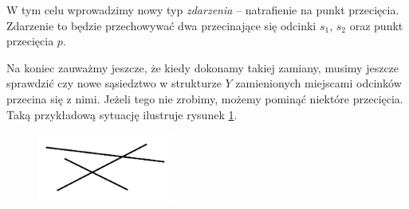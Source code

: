 W tym celu wprowadzimy nowy typ \textit{zdarzenia} -- natrafienie na punkt 
przecięcia. Zdarzenie to będzie przechowywać dwa przecinające się 
odcinki $s_1$, $s_2$ oraz punkt przecięcia $p$.

Na koniec zauważmy jeszcze, że kiedy dokonamy takiej zamiany, musimy 
jeszcze sprawdzić czy nowe sąsiedztwo w strukturze $Y$ zamienionych miejscami 
odcinków przecina się z nimi. Jeżeli tego nie zrobimy, możemy pominąć niektóre przecięcia.
Taką przykładową sytuację ilustruje rysunek \ref{fig:zamiatanie_kontrprzyklad_wariant2}.

\begin{figure}[H]
	\centering
	\includegraphics[width=0.4\textwidth]{data/zamiatanie_wariant2_kontrprzyklad.png}
	\caption{ %
	 }
	\label{fig:zamiatanie_kontrprzyklad_wariant2}
\end{figure}

